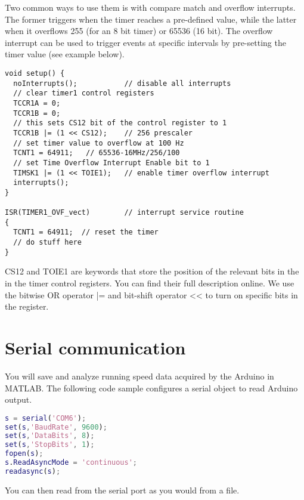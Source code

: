 \documentclass[a4paper,10pt]{article}
\begin{document}
Two common ways to 
use them is with compare match and overflow interrupts. The former triggers when the timer
reaches a pre-defined value, while the latter when it overflows 255 (for an 8 bit timer) or 
65536 (16 bit). The overflow interrupt can be used to trigger events at specific intervals
by pre-setting the timer value (see example below).

\begin{lstlisting}
void setup() {
  noInterrupts();           // disable all interrupts
  // clear timer1 control registers
  TCCR1A = 0;
  TCCR1B = 0;
  // this sets CS12 bit of the control register to 1
  TCCR1B |= (1 << CS12);    // 256 prescaler 
  // set timer value to overflow at 100 Hz
  TCNT1 = 64911;   // 65536-16MHz/256/100
  // set Time Overflow Interrupt Enable bit to 1
  TIMSK1 |= (1 << TOIE1);   // enable timer overflow interrupt
  interrupts();  
}

ISR(TIMER1_OVF_vect)        // interrupt service routine 
{
  TCNT1 = 64911;  // reset the timer
  // do stuff here
}
\end{lstlisting}

CS12 and TOIE1 are keywords that store the position of the relevant bits in the 
in the timer control registers. You can find their full description online. We use 
the bitwise OR operator |= and bit-shift operator << to turn on specific bits in 
the register.

\section{Serial communication}
You will save and analyze running speed data acquired by the Arduino in MATLAB.
The following code sample configures a serial object to read Arduino
output.

\begin{lstlisting}[language=matlab]
 % initialize serial communication
s = serial('COM6');
set(s,'BaudRate', 9600);
set(s,'DataBits', 8);
set(s,'StopBits', 1);
fopen(s);
s.ReadAsyncMode = 'continuous';
readasync(s);
\end{lstlisting}

You can then read from the serial port as you would from a file.
\end{document}
